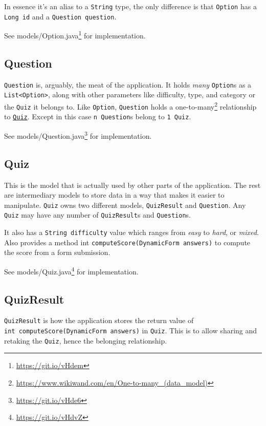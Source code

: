 \documentclass[english,a4paper,]{report}
\renewcommand{\href}[2]{#2\footnote{\url{#1}}}
\begin{document}
In essence it's an alias to a \texttt{String} type, the only difference
is that \texttt{Option} has a \texttt{Long\ id} and a
\texttt{Question\ question}.

See \href{https://git.io/vHdem}{models/Option.java} for implementation.

\hypertarget{question}{\subsection{Question}\label{question}}

\texttt{Question} is, arguably, the meat of the application. It holds
\emph{many} \texttt{Option}s as a
\texttt{List\textless{}Option\textgreater{}}, along with other
parameters like difficulty, type, and category or the \texttt{Quiz} it
belongs to. Like \texttt{Option}, \texttt{Question} holds a
\href{https://www.wikiwand.com/en/One-to-many_(data_model)}{one-to-many}
relationship to \protect\hyperlink{quiz}{\texttt{Quiz}}. Except in this
case \texttt{n\ Question}s belong to \texttt{1\ Quiz}.

See \href{https://git.io/vHde6}{models/Question.java} for
implementation.

\hypertarget{quiz}{\subsection{Quiz}\label{quiz}}

This is the model that is actually used by other parts of the
application. The rest are intermediary models to store data in a way
that makes it easier to manipulate. \texttt{Quiz} owns two different
models, \texttt{QuizResult} and \texttt{Question}. Any \texttt{Quiz} may
have any number of \texttt{QuizResult}s and \texttt{Question}s.

It also has a \texttt{String\ difficulty} value which ranges from
\emph{easy} to \emph{hard}, or \emph{mixed}. Also provides a method int
\texttt{computeScore(DynamicForm\ answers)} to compute the score from a
form submission.

See \href{https://git.io/vHdvZ}{models/Quiz.java} for implementation.

\subsection{QuizResult}\label{quizresult}

\texttt{QuizResult} is how the application stores the return value of
\texttt{int\ computeScore(DynamicForm\ answers)} in \texttt{Quiz}. This
is to allow sharing and retaking the \texttt{Quiz}, hence the belonging
relationship.
\end{document}
